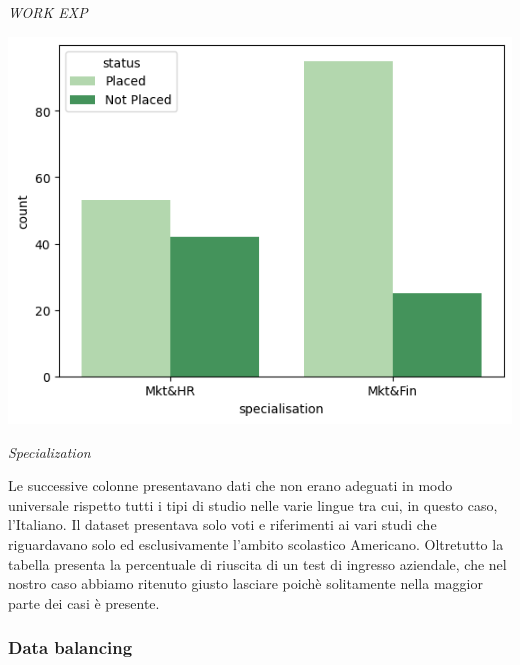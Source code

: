 \documentclass{article}
\begin{document}
\begin{center}
    \textit{WORK EXP}
    
    \includegraphics[scale=0.5]{specialisation.png}

    \textit{Specialization}
\end{center}

Le successive colonne presentavano dati che non erano adeguati in modo universale rispetto tutti i tipi di studio nelle varie lingue
tra cui, in questo caso, l'Italiano. Il dataset presentava solo voti e riferimenti ai vari studi che riguardavano solo ed esclusivamente
l'ambito scolastico Americano. Oltretutto la tabella presenta la percentuale di riuscita di un test di ingresso aziendale, che nel nostro caso
abbiamo ritenuto giusto lasciare poichè solitamente nella maggior parte dei casi è presente.

\subsubsection{Data balancing}
\end{document}
